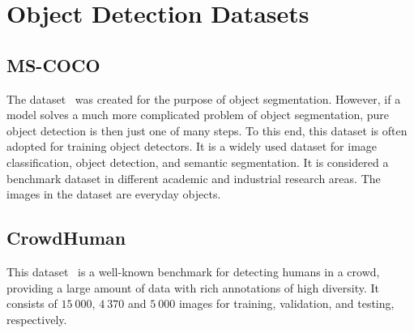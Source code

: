 \section{Object Detection Datasets}
\label{sec:ObjectDetectionDatasets}

\subsection{MS-COCO}
\label{ssec:DatasetMSCOCO}

The \mscoco{} dataset~\cite{lin2014mscoco} was created for the purpose of object segmentation. However, if a model solves a much more complicated problem of object segmentation, pure object detection is then just one of many steps. To this end, this dataset is often adopted for training object detectors. It is a widely used dataset for image classification, object detection, and semantic segmentation. It is considered a benchmark dataset in different academic and industrial research areas. The images in the dataset are everyday objects.

\subsection{CrowdHuman}
\label{ssec:DatasetCrowdHuman}

This dataset~\cite{shao2018crowdhuman} is a well-known benchmark for detecting humans in a crowd, providing a large amount of data with rich annotations of high diversity. It consists of $15\ 000$, $4\ 370$ and $5\ 000$ images for training, validation, and testing, respectively.